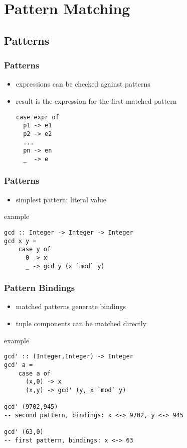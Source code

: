 \documentclass[dvipsnames]{beamer}
\theoremstyle{plain}
\begin{document}
\section{Pattern Matching}

\subsection{Patterns}

\begin{frame}[fragile]
  \frametitle{Patterns}

  \begin{itemize}
    \item expressions can be checked against patterns
    \item result is the expression for the first matched pattern

    \medskip
    \begin{lstlisting}
case expr of
  p1 -> e1
  p2 -> e2
  ...
  pn -> en
  _  -> e
    \end{lstlisting}
  \end{itemize}
\end{frame}

\begin{frame}[fragile]
  \frametitle{Patterns}

  \begin{itemize}
    \item simplest pattern: literal value
  \end{itemize}

  \begin{exampleblock}{example}
    \begin{lstlisting}
gcd :: Integer -> Integer -> Integer
gcd x y =
    case y of
      0 -> x
      _ -> gcd y (x `mod` y)
    \end{lstlisting}
  \end{exampleblock}
\end{frame}

\begin{frame}[fragile]
  \frametitle{Pattern Bindings}

  \begin{itemize}
    \item matched patterns generate bindings
    \item tuple components can be matched directly
  \end{itemize}

  \begin{exampleblock}{example}
    \begin{lstlisting}
gcd' :: (Integer,Integer) -> Integer
gcd' a =
    case a of
      (x,0) -> x
      (x,y) -> gcd' (y, x `mod` y)

gcd' (9702,945)
-- second pattern, bindings: x <-> 9702, y <-> 945

gcd' (63,0)
-- first pattern, bindings: x <-> 63
    \end{lstlisting}
  \end{exampleblock}
\end{frame}
\end{document}
